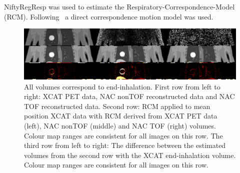 \documentclass[portrait,color=UCLburgundy,margin=2cm]{uclposter}
\begin{document}
\begin{multicols}{4}
NiftyRegResp was used to estimate the Respiratory-Correspondence-Model (RCM). Following~\cite{McClelland2013} a direct correspondence motion model was used.

\end{multicols}

\begin{figure}[b]
    \centering
    \includegraphics[width=0.9\linewidth]{output_flipped.png}
    \caption{All volumes correspond to end-inhalation. First row from left to right: XCAT PET data, NAC nonTOF reconstructed data and NAC TOF reconstructed data. Second row: RCM applied to mean position XCAT data with RCM derived from XCAT PET data (left), NAC nonTOF (middle) and NAC TOF (right) volumes. Colour map ranges are consistent for all images on this row. The third row from left to right: The difference between the estimated volumes from the second row with the XCAT end-inhalation volume. Colour map ranges are consistent for all images on this row.}
    \label{fig:output}
\end{figure}
\end{document}
